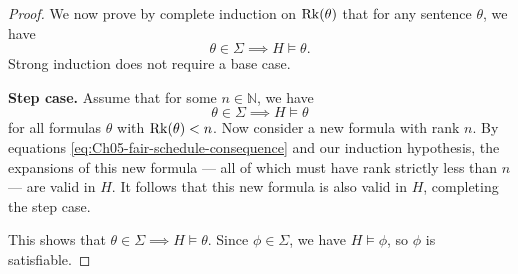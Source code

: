 \begin{proof}
    We now prove by complete induction on \(\operatorname{Rk}(\theta)\) that for any sentence \(\theta\), we have
    \[\theta\in\Sigma\implies H \models\theta\text{.}\]
    Strong induction does not require a base case.
    
    \textbf{Step case.} Assume that for some \(n \in\mathbb{N}\), we have
    \[\theta\in\Sigma\implies H \models\theta\]
    for all formulas \(\theta\) with \(\operatorname{Rk}(\theta) < n\). Now consider a new formula with rank \(n\). By equations \eqref{eq:Ch05-fair-schedule-consequence} and our induction hypothesis, the expansions of this new formula --- all of which must have rank strictly less than \(n\) --- are valid in \(H\). It follows that this new formula is also valid in \(H\), completing the step case.

    This shows that \(\theta\in\Sigma\implies H \models\theta\). Since \(\phi\in\Sigma\), we have \(H\models\phi\), so \(\phi\) is satisfiable.
\end{proof}